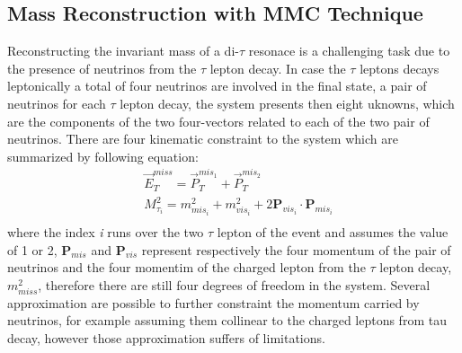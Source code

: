 \subsection{Mass Reconstruction with MMC Technique}\label{sec:mmc}

Reconstructing the invariant mass of a di-$\tau$ resonace is a challenging task
due to the presence of neutrinos from the $\tau$ lepton decay. 
In case the $\tau$ leptons decays leptonically a total of four neutrinos are involved in the final state, a pair of neutrinos for each
$\tau$ lepton decay,  the system presents then eight uknowns, which are the components of the two 
four-vectors related to each of the two pair of neutrinos.  There are four kinematic constraint to the system which are summarized by 
following equation:
\begin{equation} \label{eq:MMC}
\begin{split}
&\vec{E}_T^{miss} = \vec{P}_{T}^{mis_{1}} +  \vec{P}_{T}^{mis_2} \\
&M_{\tau_{i}}^2 = m^2_{mis_{i}} + m^2_{vis_{i}} + 2 \mathbf{P}_{vis_i} \cdot \mathbf{P}_{mis_i} \\
\end{split}
\end{equation}
where the index \emph{i} runs over the two $\tau$ lepton of the event and assumes the value of 1 or 2, 
$\mathbf{P}_{mis}$ and $\mathbf{P}_{vis}$ represent respectively the four momentum of the pair of neutrinos 
and the four momentim of the charged lepton from the $\tau$ lepton decay, $m^2_{miss}$, therefore there are still four degrees of freedom in the system.
Several approximation are possible to further constraint the momentum carried by neutrinos,
for example assuming them collinear to the charged leptons from tau decay, however those approximation suffers of limitations. 

